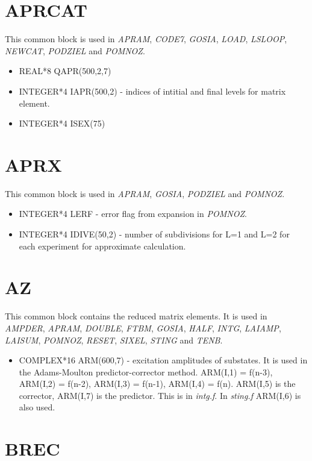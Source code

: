 \section{APRCAT}

This common block is used in {\em APRAM}, {\em CODE7}, {\em GOSIA}, {\em
LOAD}, {\em LSLOOP}, {\em NEWCAT}, {\em PODZIEL} and {\em POMNOZ}.

\begin{itemize}
\item REAL*8 QAPR(500,2,7)
\item INTEGER*4 IAPR(500,2) - indices of intitial and final levels for
matrix element.
\item INTEGER*4 ISEX(75)
\end{itemize}

\section{APRX}

This common block is used in {\em APRAM}, {\em GOSIA}, {\em PODZIEL} and
{\em POMNOZ}.

\begin{itemize}
\item INTEGER*4 LERF - error flag from expansion in {\em POMNOZ}.
\item INTEGER*4 IDIVE(50,2) - number of subdivisions for L=1 and L=2 for
each experiment for approximate calculation.
\end{itemize}

\section{AZ}

This common block contains the reduced matrix elements. It is used in {\em
AMPDER}, {\em APRAM}, {\em DOUBLE}, {\em FTBM}, {\em GOSIA}, {\em HALF},
{\em INTG}, {\em LAIAMP}, {\em LAISUM}, {\em POMNOZ}, {\em RESET}, {\em
SIXEL}, {\em STING} and {\em TENB}.

\begin{itemize}
\item COMPLEX*16 ARM(600,7) - excitation amplitudes of substates. It is used
in the Adams-Moulton predictor-corrector method. ARM(I,1) = f(n-3), ARM(I,2)
= f(n-2), ARM(I,3) = f(n-1), ARM(I,4) = f(n). ARM(I,5) is the corrector,
ARM(I,7) is the predictor. This is in {\em intg.f}. In {\em sting.f}
ARM(I,6) is also used.
\end{itemize}

\section{BREC}

